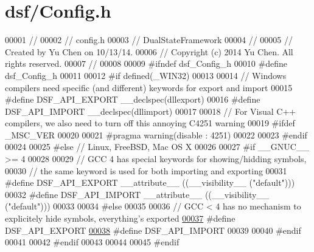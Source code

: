 \hypertarget{dsf_2_config_8h_source}{}\section{dsf/\+Config.h}
\label{dsf_2_config_8h_source}

\begin{DoxyCode}
00001 \textcolor{comment}{//}
00002 \textcolor{comment}{//  config.h}
00003 \textcolor{comment}{//  DualStateFramework}
00004 \textcolor{comment}{//}
00005 \textcolor{comment}{//  Created by Yu Chen on 10/13/14.}
00006 \textcolor{comment}{//  Copyright (c) 2014 Yu Chen. All rights reserved.}
00007 \textcolor{comment}{//}
00008 
00009 \textcolor{preprocessor}{#ifndef dsf\_Config\_h}
00010 \textcolor{preprocessor}{#define dsf\_Config\_h}
00011 
00012 \textcolor{preprocessor}{#if defined(\_WIN32)}
00013 
00014 \textcolor{comment}{// Windows compilers need specific (and different) keywords for export and import}
00015 \textcolor{preprocessor}{#define DSF\_API\_EXPORT \_\_declspec(dllexport)}
00016 \textcolor{preprocessor}{#define DSF\_API\_IMPORT \_\_declspec(dllimport)}
00017 
00018 \textcolor{comment}{// For Visual C++ compilers, we also need to turn off this annoying C4251 warning}
00019 \textcolor{preprocessor}{#ifdef \_MSC\_VER}
00020 
00021 \textcolor{preprocessor}{#pragma warning(disable : 4251)}
00022 
00023 \textcolor{preprocessor}{#endif}
00024 
00025 \textcolor{preprocessor}{#else // Linux, FreeBSD, Mac OS X}
00026 
00027 \textcolor{preprocessor}{#if \_\_GNUC\_\_ >= 4}
00028 
00029 \textcolor{comment}{// GCC 4 has special keywords for showing/hidding symbols,}
00030 \textcolor{comment}{// the same keyword is used for both importing and exporting}
00031 \textcolor{preprocessor}{#define DSF\_API\_EXPORT \_\_attribute\_\_ ((\_\_visibility\_\_ ("default")))}
00032 \textcolor{preprocessor}{#define DSF\_API\_IMPORT \_\_attribute\_\_ ((\_\_visibility\_\_ ("default")))}
00033 
00034 \textcolor{preprocessor}{#else}
00035 
00036 \textcolor{comment}{// GCC < 4 has no mechanism to explicitely hide symbols, everything's exported}
\hypertarget{dsf_2_config_8h_source_l00037}{}\hyperlink{dsf_2_config_8h_aec0d599ebe2920c340175b53a6c5b2a5}{00037} \textcolor{preprocessor}{#define DSF\_API\_EXPORT}
\hypertarget{dsf_2_config_8h_source_l00038}{}\hyperlink{dsf_2_config_8h_a0cff0b27ee66dcfd02744ff848b54b4a}{00038} \textcolor{preprocessor}{#define DSF\_API\_IMPORT}
00039 
00040 \textcolor{preprocessor}{#endif}
00041 
00042 \textcolor{preprocessor}{#endif}
00043 
00044 
00045 \textcolor{preprocessor}{#endif}
\end{DoxyCode}
